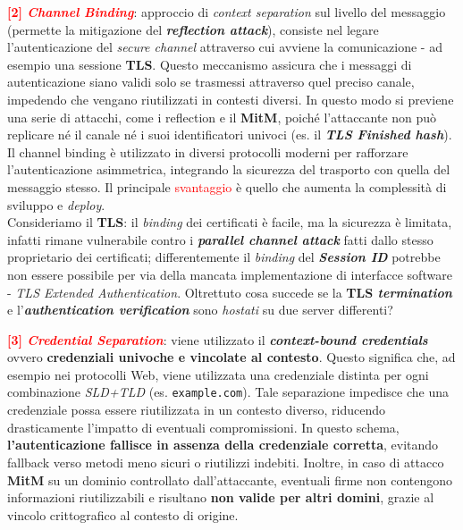 \begin{flushleft}
    \medskip

    \textcolor{red}{\textbf{[2] \textit{Channel Binding}}}: approccio di \textit{context separation} sul livello del messaggio (permette la mitigazione del \textbf{\textit{reflection attack}}), consiste nel legare l'autenticazione del \textit{secure channel} attraverso cui avviene la comunicazione - ad esempio una sessione \textbf{TLS}. Questo meccanismo assicura che i messaggi di autenticazione siano validi solo se trasmessi attraverso quel preciso canale, impedendo che vengano riutilizzati in contesti diversi. In questo modo si previene una serie di attacchi, come i reflection e il \textbf{MitM}, poiché l'attaccante non può replicare né il canale né i suoi identificatori univoci (es. il \textbf{\textit{TLS Finished hash}}). Il channel binding è utilizzato in diversi protocolli moderni per rafforzare l'autenticazione asimmetrica, integrando la sicurezza del trasporto con quella del messaggio stesso. Il principale \textcolor{red}{svantaggio} è quello che aumenta la complessità di sviluppo e \textit{deploy}. \\
    Consideriamo il \textbf{TLS}: il \textit{binding} dei certificati è facile, ma la sicurezza è limitata, infatti rimane vulnerabile contro i \textbf{\textit{parallel channel attack}} fatti dallo stesso proprietario dei certificati; differentemente il \textit{binding} del \textbf{\textit{Session ID}} potrebbe non essere possibile per via della mancata implementazione di interfacce software - \textit{TLS Extended Authentication}. Oltrettuto cosa succede se la \textbf{TLS \textit{termination}} e l'\textbf{\textit{authentication verification}} sono \textit{hostati} su due server differenti?

    \medskip

    \textcolor{red}{\textbf{[3] \textit{Credential Separation}}}: viene utilizzato il \textbf{\textit{context-bound credentials}} ovvero \textbf{credenziali univoche e vincolate al contesto}. Questo significa che, ad esempio nei protocolli Web, viene utilizzata una credenziale distinta per ogni combinazione \textit{SLD+TLD} (es. \texttt{example.com}). Tale separazione impedisce che una credenziale possa essere riutilizzata in un contesto diverso, riducendo drasticamente l'impatto di eventuali compromissioni. In questo schema, \textbf{l'autenticazione fallisce in assenza della credenziale corretta}, evitando fallback verso metodi meno sicuri o riutilizzi indebiti. Inoltre, in caso di attacco \textbf{MitM} su un dominio controllato dall'attaccante, eventuali firme non contengono informazioni riutilizzabili e risultano \textbf{non valide per altri domini}, grazie al vincolo crittografico al contesto di origine.


\end{flushleft}

